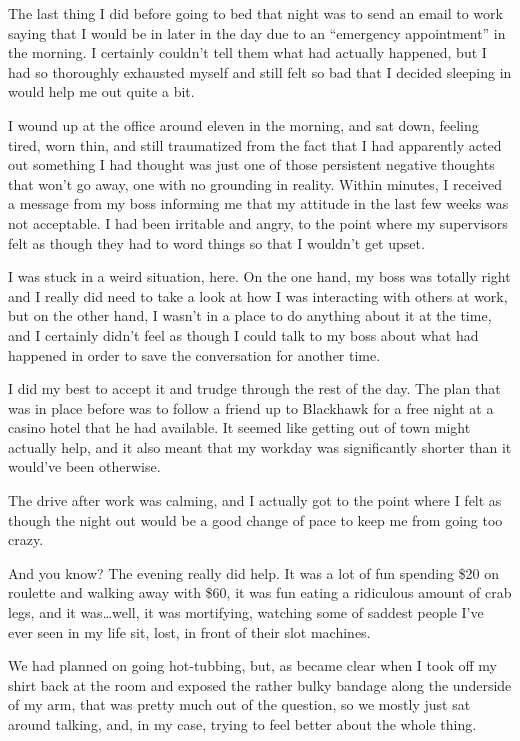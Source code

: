 \begin{paracol}{2}
\begin{leftcolumn}
The last thing I did before going to bed that night was to send an email to work saying that I would be in later in the day due to an ``emergency appointment'' in the morning. I certainly couldn't tell them what had actually happened, but I had so thoroughly exhausted myself and still felt so bad that I decided sleeping in would help me out quite a bit.

I wound up at the office around eleven in the morning, and sat down, feeling tired, worn thin, and still traumatized from the fact that I had apparently acted out something I had thought was just one of those persistent negative thoughts that won't go away, one with no grounding in reality. Within minutes, I received a message from my boss informing me that my attitude in the last few weeks was not acceptable. I had been irritable and angry, to the point where my supervisors felt as though they had to word things so that I wouldn't get upset.

I was stuck in a weird situation, here. On the one hand, my boss was totally right and I really did need to take a look at how I was interacting with others at work, but on the other hand, I wasn't in a place to do anything about it at the time, and I certainly didn't feel as though I could talk to my boss about what had happened in order to save the conversation for another time.

I did my best to accept it and trudge through the rest of the day. The plan that was in place before was to follow a friend up to Blackhawk for a free night at a casino hotel that he had available. It seemed like getting out of town might actually help, and it also meant that my workday was significantly shorter than it would've been otherwise.

The drive after work was calming, and I actually got to the point where I felt as though the night out would be a good change of pace to keep me from going too crazy.

And you know? The evening really did help. It was a lot of fun spending \$20 on roulette and walking away with \$60, it was fun eating a ridiculous amount of crab legs, and it was\ldots{}well, it was mortifying, watching some of saddest people I've ever seen in my life sit, lost, in front of their slot machines.

We had planned on going hot-tubbing, but, as became clear when I took off my shirt back at the room and exposed the rather bulky bandage along the underside of my arm, that was pretty much out of the question, so we mostly just sat around talking, and, in my case, trying to feel better about the whole thing.


\end{leftcolumn}
\end{paracol}
